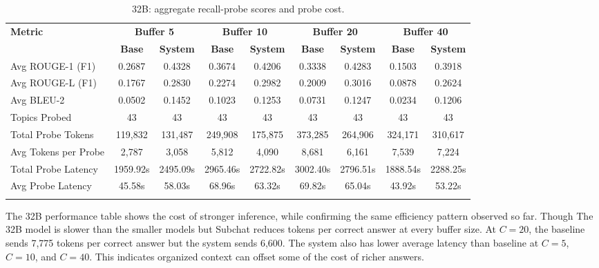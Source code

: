 \begin{table}[htbp]
\caption{32B: aggregate recall-probe scores and probe cost.}\label{tab:32b_recall_main}
\centering
\scriptsize
\setlength{\tabcolsep}{3pt}
\begin{adjustbox}{width=\textwidth}
\begin{tabular}{lcccccccc}
\toprule
\textbf{Metric} & \multicolumn{2}{c}{\textbf{Buffer 5}} & \multicolumn{2}{c}{\textbf{Buffer 10}} & \multicolumn{2}{c}{\textbf{Buffer 20}} & \multicolumn{2}{c}{\textbf{Buffer 40}} \\
\cmidrule(lr){2-3}\cmidrule(lr){4-5}\cmidrule(lr){6-7}\cmidrule(lr){8-9}
 & \textbf{Base} & \textbf{System} & \textbf{Base} & \textbf{System} & \textbf{Base} & \textbf{System} & \textbf{Base} & \textbf{System} \\
\midrule
Avg ROUGE-1 (F1) & 0.2687 & 0.4328 & 0.3674 & 0.4206 & 0.3338 & 0.4283 & 0.1503 & 0.3918 \\
Avg ROUGE-L (F1) & 0.1767 & 0.2830 & 0.2274 & 0.2982 & 0.2009 & 0.3016 & 0.0878 & 0.2624 \\
Avg BLEU-2 & 0.0502 & 0.1452 & 0.1023 & 0.1253 & 0.0731 & 0.1247 & 0.0234 & 0.1206 \\
Topics Probed & 43 & 43 & 43 & 43 & 43 & 43 & 43 & 43 \\
Total Probe Tokens & 119,832 & 131,487 & 249,908 & 175,875 & 373,285 & 264,906 & 324,171 & 310,617 \\
Avg Tokens per Probe & 2,787 & 3,058 & 5,812 & 4,090 & 8,681 & 6,161 & 7,539 & 7,224 \\
Total Probe Latency & 1959.92s & 2495.09s & 2965.46s & 2722.82s & 3002.40s & 2796.51s & 1888.54s & 2288.25s \\
Avg Probe Latency & 45.58s & 58.03s & 68.96s & 63.32s & 69.82s & 65.04s & 43.92s & 53.22s \\
\botrule
\end{tabular}
\end{adjustbox}
\end{table}

The 32B performance table shows the cost of stronger inference, while confirming the same efficiency pattern observed so far. Though The 32B model is slower than the smaller models but Subchat  reduces tokens per correct answer at every buffer size. At $C=20$, the baseline sends 7,775 tokens per correct answer but the system sends 6,600. The system also has lower average latency than baseline at $C=5$, $C=10$, and $C=40$. This indicates organized context can offset some of the cost of richer answers.

